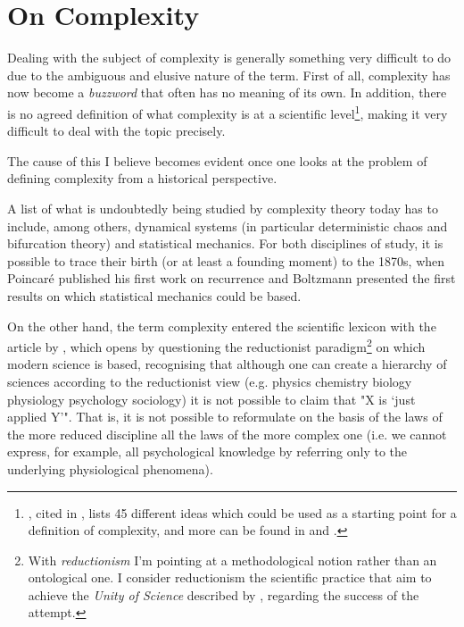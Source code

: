 \section{On Complexity}
Dealing with the subject of complexity is generally something very difficult to do due to the ambiguous and elusive nature of the term.
First of all, complexity has now become a \textit{buzzword} that often has no meaning of its own.
In addition, there is no agreed definition of what complexity is at a scientific level\footnote{\textcite{horgan2015}, cited in \textcite{holt2011}, lists 45 different ideas which could be used as a starting point for a definition of complexity, and more can be found in \textcite{hooker2011} and \textcite{ladyman2020}.}, making it very difficult to deal with the topic precisely.

The cause of this I believe becomes evident once one looks at the problem of defining complexity from a historical perspective.

A list of what is undoubtedly being studied by complexity theory today has to include, among others, dynamical systems (in particular deterministic chaos and bifurcation theory) and statistical mechanics. For both disciplines of study, it is possible to trace their birth (or at least a founding moment) to the 1870s, when Poincaré published his first work on recurrence and Boltzmann presented the first results on which statistical mechanics could be based.

On the other hand, the term complexity entered the scientific lexicon with the \citeyear{anderson1972} article by \citeauthor{anderson1972}, which opens by questioning the reductionist paradigm\footnote{With \textit{reductionism} I'm pointing at a methodological notion rather than an ontological one. I consider reductionism the scientific practice that aim to achieve the \textit{Unity of Science} described by \textcite{oppenheim1958}, regarding the success of the attempt.} on which modern science is based, recognising that although one can create a hierarchy of sciences according to the reductionist view (e.g. physics \textrightarrow{} chemistry \textrightarrow{} biology \textrightarrow{} physiology \textrightarrow{} psychology \textrightarrow{} sociology) it is not possible to claim that "X is `just applied Y'".
That is, it is not possible to reformulate on the basis of the laws of the more reduced discipline all the laws of the more complex one (i.e. we cannot express, for example, all psychological knowledge by referring only to the underlying physiological phenomena).

